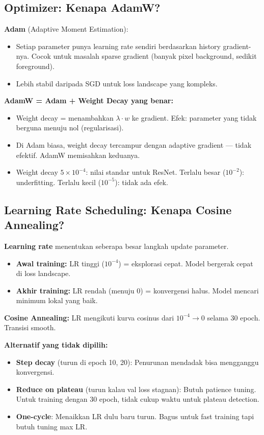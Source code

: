\documentclass[10pt,a4paper,onecolumn]{article}
\begin{document}
\subsection{Optimizer: Kenapa AdamW?}

\textbf{Adam} (Adaptive Moment Estimation):
\begin{itemize}[nosep]
    \item Setiap parameter punya learning rate sendiri berdasarkan
          history gradient-nya. Cocok untuk masalah sparse gradient
          (banyak pixel background, sedikit foreground).
    \item Lebih stabil daripada SGD untuk loss landscape yang kompleks.
\end{itemize}

\textbf{AdamW = Adam + Weight Decay yang benar:}
\begin{itemize}[nosep]
    \item Weight decay = menambahkan $\lambda \cdot w$ ke gradient.
          Efek: parameter yang tidak berguna menuju nol (regularisasi).
    \item Di Adam biasa, weight decay tercampur dengan adaptive
          gradient — tidak efektif. AdamW memisahkan keduanya.
    \item Weight decay $5\times 10^{-4}$: nilai standar untuk
          ResNet. Terlalu besar ($10^{-2}$): underfitting. Terlalu
          kecil ($10^{-5}$): tidak ada efek.
\end{itemize}

\subsection{Learning Rate Scheduling: Kenapa Cosine Annealing?}

\textbf{Learning rate} menentukan seberapa besar langkah update
parameter.

\begin{itemize}[nosep]
    \item \textbf{Awal training:} LR tinggi ($10^{-4}$) = eksplorasi
          cepat. Model bergerak cepat di loss landscape.
    \item \textbf{Akhir training:} LR rendah (menuju 0) = konvergensi
          halus. Model mencari minimum lokal yang baik.
\end{itemize}

\textbf{Cosine Annealing:} LR mengikuti kurva cosinus dari
$10^{-4} \rightarrow 0$ selama 30 epoch. Transisi smooth.

\textbf{Alternatif yang tidak dipilih:}
\begin{itemize}[nosep]
    \item \textbf{Step decay} (turun di epoch 10, 20): Penurunan
          mendadak bisa mengganggu konvergensi.
    \item \textbf{Reduce on plateau} (turun kalau val loss stagnan):
          Butuh patience tuning. Untuk training dengan 30 epoch,
          tidak cukup waktu untuk plateau detection.
    \item \textbf{One-cycle}: Menaikkan LR dulu baru turun. Bagus
          untuk fast training tapi butuh tuning max LR.
\end{itemize}
\end{document}
